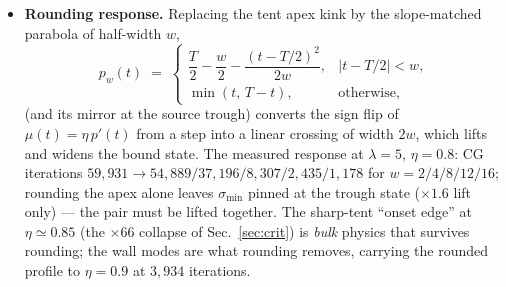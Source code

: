\documentclass[11pt]{article}
\begin{document}
\begin{itemize}
computed directly between the numerically converged low modes and the
wall source,
\begin{equation}
\mathcal{O}_k \;=\;
\frac{\left|\langle v_k,\, \eta_{\rm wall}\rangle\right|^2}
{\|v_k\|^2\,\|\eta_{\rm wall}\|^2}\;\lesssim\;10^{-6},
\end{equation}
explaining why plain CG on wall sources converges through a spectrum
whose $\kappa$ would forbid it for generic right-hand sides: the apex
mode is spatially separated from the source slice, and the trough mode
sits \emph{on} the source slice but in the conjugate-grading components
the source does not populate.
\item \textbf{Rounding response.}  Replacing the tent apex kink by the
slope-matched parabola of half-width $w$,
\begin{equation}
p_w(t) \;=\;
\begin{cases}
\dfrac{T}{2} - \dfrac{w}{2} - \dfrac{(t - T/2)^2}{2w},
& |t - T/2| < w,\\[6pt]
\min(t,\, T-t), & \text{otherwise},
\end{cases}
\end{equation}
(and its mirror at the source trough) converts the sign flip of
$\mu(t) = \eta\,p'(t)$ from a step into a linear crossing of width
$2w$, which lifts and widens the bound state.  The measured response at
$\lambda = 5$, $\eta = 0.8$: CG iterations
$59{,}931 \to 54{,}889 / 37{,}196 / 8{,}307 / 2{,}435 / 1{,}178$ for
$w = 2/4/8/12/16$; rounding the apex alone leaves $\sigma_{\min}$
pinned at the trough state ($\times1.6$ lift only) --- the pair must be
lifted together.  The sharp-tent ``onset edge'' at $\eta \simeq 0.85$
(the $\times 66$ collapse of Sec.~\ref{sec:crit}) is \emph{bulk}
physics that survives rounding; the wall modes are what rounding
removes, carrying the rounded profile to $\eta = 0.9$ at $3{,}934$
iterations.
\end{itemize}
\end{document}
